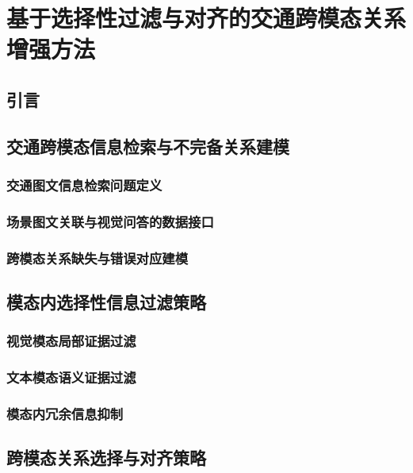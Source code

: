 
\chapter{基于选择性过滤与对齐的交通跨模态关系增强方法}

\section{引言}

\section{交通跨模态信息检索与不完备关系建模}

\subsection{交通图文信息检索问题定义}

\subsection{场景图文关联与视觉问答的数据接口}

\subsection{跨模态关系缺失与错误对应建模}

\section{模态内选择性信息过滤策略}

\subsection{视觉模态局部证据过滤}

\subsection{文本模态语义证据过滤}

\subsection{模态内冗余信息抑制}

\section{跨模态关系选择与对齐策略}

